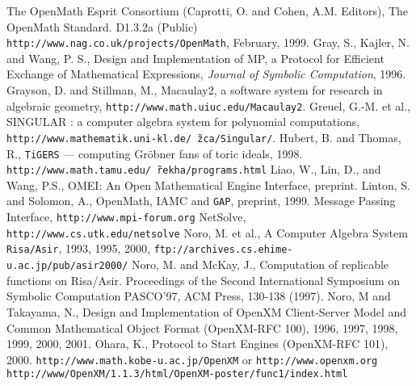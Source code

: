 
\begin{thebibliography}{X}
The OpenMath Esprit Consortium 
(Caprotti, O. and Cohen, A.M. Editors),
The OpenMath Standard. D1.3.2a (Public) \\
{\small {\tt http://www.nag.co.uk/projects/OpenMath}},
February, 1999.
Gray, S., Kajler, N. and Wang, P. S.,
Design and Implementation of MP, a Protocol for Efficient
  Exchange of Mathematical Expressions,
{\sl Journal of Symbolic Computation}, 1996.
Grayson, D. and Stillman, M.,
Macaulay2, a software system for research in algebraic geometry,
 {\small {\tt http://www.math.uiuc.edu/Macaulay2}}.
Greuel, G.-M. et al., SINGULAR : a computer algebra system for polynomial
computations,
{\small {\tt http://www.mathematik.uni-kl.de/\~\,zca/Singular/}}.
Hubert, B. and Thomas, R.,
{\tt TiGERS} --- computing Gr\"obner fans of toric
ideals, 1998.
{\small
{\tt http://www.math.tamu.edu/\~\,rekha/programs.html}}
Liao, W., Lin, D., and Wang, P.S.,
{OMEI: An Open Mathematical Engine Interface},
preprint.
Linton, S. and Solomon, A.,
OpenMath, IAMC and {\tt GAP},
preprint, 1999.
 Message Passing Interface,
{\small {\tt http://www.mpi-forum.org}} 
NetSolve, {\small {\tt http://www.cs.utk.edu/netsolve}}
Noro, M. et al., 
A Computer Algebra System {\tt Risa/Asir},  1993, 1995, 2000,
{\small {\tt ftp://archives.cs.ehime-u.ac.jp/pub/asir2000/}}
Noro, M. and McKay, J.,
Computation of replicable functions on Risa/Asir.
Proceedings of the Second International Symposium on
Symbolic Computation PASCO'97, ACM Press, 130-138 (1997).
Noro, M and Takayama, N., Design and Implementation
of OpenXM Client-Server Model and Common Mathematical Object Format
(OpenXM-RFC 100), 1996, 1997, 1998, 1999, 2000, 2001.
Ohara, K.,
Protocol to Start Engines (OpenXM-RFC 101),
2000.
{\small {\tt http://www.math.kobe-u.ac.jp/OpenXM}}
or 
{\small {\tt http://www.openxm.org}}
{\small {\tt http://www/OpenXM/1.1.3/html/OpenXM-poster/func1/index.html}}

\end{thebibliography}
